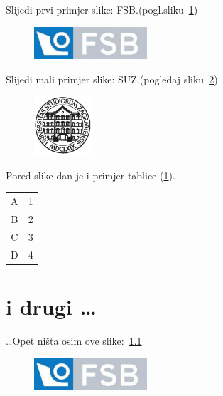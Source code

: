 \documentclass[a4paper,12pt]{report}
\begin{document}
Slijedi prvi primjer slike: FSB.(pogl.sliku~\ref{figa1})
%

\begin{figure}[h]
  \centering
  \includegraphics[height=1.2cm]{fsb_logo}\\
  \label{figa1}
\end{figure}

\clearpage
Slijedi mali primjer slike: SUZ.(pogledaj sliku~\ref{figa2})
%

\begin{figure}
  \centering
  \includegraphics[height=2.2cm]{suz_grb}\\
  \label{figa2}
\end{figure}


Pored slike dan je i primjer tablice (\ref{tablicaa}).

\begin{table}[!h]
\label{tablicaa}
  \centering
\begin{tabular}{|c c|} \hline
    A & 1 \\
    B & 2 \\
    C & 3 \\
    D & 4 \\ \hline
\end{tabular}
\end{table}

\chapter{i drugi \dots}
\dots Opet ništa osim ove slike:~\ref{dodatna}
\begin{figure}
  \centering
  \includegraphics[height=1.2cm]{fsb_logo}
  \label{dodatna}
\end{figure}
\newpage
\end{document}
